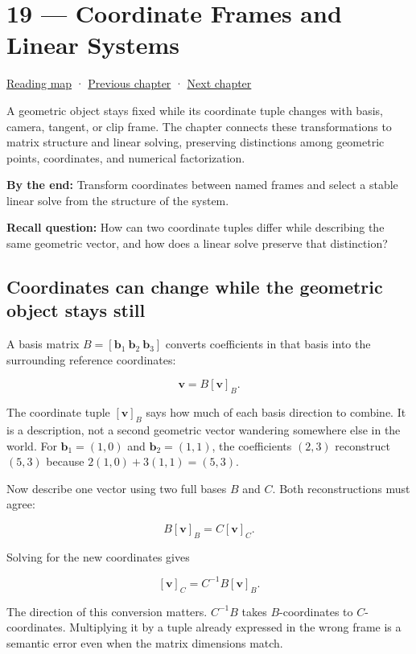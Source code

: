 \hypertarget{01-foundations-i-ch019}{}
\chapter{19 --- Coordinate Frames and Linear Systems}\label{01-foundations-i-ch019-coordinate-frames-and-linear-systems}

\hyperref[volume-reading-map]{Reading map} · \hyperref[01-foundations-i-ch018]{Previous chapter} · \hyperref[01-foundations-i-ch020]{Next chapter}

A geometric object stays fixed while its coordinate tuple changes with basis, camera, tangent, or clip frame. The chapter connects these transformations to matrix structure and linear solving, preserving distinctions among geometric points, coordinates, and numerical factorization.

\textbf{By the end:} Transform coordinates between named frames and select a stable linear solve from the structure of the system.

\textbf{Recall question:} How can two coordinate tuples differ while describing the same geometric vector, and how does a linear solve preserve that distinction?

\section{Coordinates can change while the geometric object stays still}\label{01-foundations-i-ch019-coordinates-can-change-while-the-geometric-object-stays-still}

A basis matrix \(B=[\mathbf b_1\ \mathbf b_2\ \mathbf b_3]\) converts coefficients in that basis into the surrounding reference coordinates:

\[
\mathbf v=B[\mathbf v]_B.
\]

The coordinate tuple \([\mathbf v]_B\) says how much of each basis direction to combine. It is a description, not a second geometric vector wandering somewhere else in the world. For \(\mathbf b_1=(1,0)\) and \(\mathbf b_2=(1,1)\), the coefficients \((2,3)\) reconstruct \((5,3)\) because \(2(1,0)+3(1,1)=(5,3)\).

Now describe one vector using two full bases \(B\) and \(C\). Both reconstructions must agree:

\[
B[\mathbf v]_B=C[\mathbf v]_C.
\]

Solving for the new coordinates gives

\[
[\mathbf v]_C=C^{-1}B[\mathbf v]_B.
\]

The direction of this conversion matters. \(C^{-1}B\) takes \(B\)-coordinates to \(C\)-coordinates. Multiplying it by a tuple already expressed in the wrong frame is a semantic error even when the matrix dimensions match.

